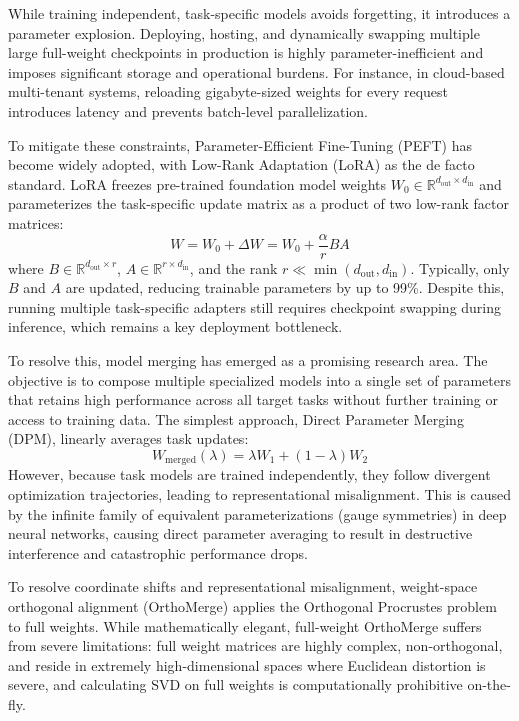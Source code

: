 \documentclass{article}
\theoremstyle{plain}
\theoremstyle{definition}
\theoremstyle{remark}
\begin{document}
While training independent, task-specific models avoids forgetting, it introduces a parameter explosion. Deploying, hosting, and dynamically swapping multiple large full-weight checkpoints in production is highly parameter-inefficient and imposes significant storage and operational burdens. For instance, in cloud-based multi-tenant systems, reloading gigabyte-sized weights for every request introduces latency and prevents batch-level parallelization.

To mitigate these constraints, Parameter-Efficient Fine-Tuning (PEFT) has become widely adopted, with Low-Rank Adaptation (LoRA) \cite{hu2021lora} as the de facto standard. LoRA freezes pre-trained foundation model weights $W_0 \in \mathbb{R}^{d_{\text{out}} \times d_{\text{in}}}$ and parameterizes the task-specific update matrix as a product of two low-rank factor matrices:
\begin{equation}
W = W_0 + \Delta W = W_0 + \frac{\alpha}{r} B A
\end{equation}
where $B \in \mathbb{R}^{d_{\text{out}} \times r}$, $A \in \mathbb{R}^{r \times d_{\text{in}}}$, and the rank $r \ll \min(d_{\text{out}}, d_{\text{in}})$. Typically, only $B$ and $A$ are updated, reducing trainable parameters by up to 99\%. Despite this, running multiple task-specific adapters still requires checkpoint swapping during inference, which remains a key deployment bottleneck.

To resolve this, model merging \cite{ilharco2022editing, Wortsman2022model} has emerged as a promising research area. The objective is to compose multiple specialized models into a single set of parameters that retains high performance across all target tasks without further training or access to training data. The simplest approach, Direct Parameter Merging (DPM), linearly averages task updates:
\begin{equation}
W_{\text{merged}}(\lambda) = \lambda W_1 + (1-\lambda) W_2
\end{equation}
However, because task models are trained independently, they follow divergent optimization trajectories, leading to representational misalignment. This is caused by the infinite family of equivalent parameterizations (gauge symmetries) in deep neural networks, causing direct parameter averaging to result in destructive interference and catastrophic performance drops.

To resolve coordinate shifts and representational misalignment, weight-space orthogonal alignment (OrthoMerge) \cite{sa-ortho} applies the Orthogonal Procrustes problem to full weights. While mathematically elegant, full-weight OrthoMerge suffers from severe limitations: full weight matrices are highly complex, non-orthogonal, and reside in extremely high-dimensional spaces where Euclidean distortion is severe, and calculating SVD on full weights is computationally prohibitive on-the-fly.
\end{document}
